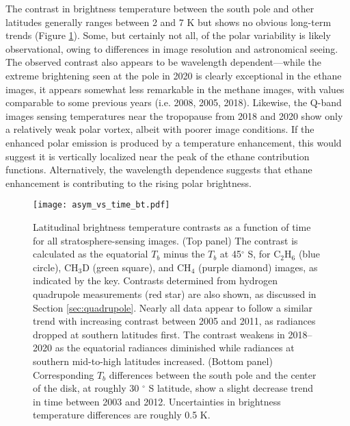 \documentclass[twocolumn,10pt]{aastex631}
\begin{document}
The contrast in brightness temperature between the south pole and other latitudes generally ranges between 2 and 7 K but shows no obvious long-term trends (Figure \ref{fig:asymm}). Some, but certainly not all, of the polar variability is likely observational, owing to differences in image resolution and astronomical seeing. The observed contrast also appears to be wavelength dependent---while the extreme brightening seen at the pole in 2020 is clearly exceptional in the ethane images, it appears somewhat less remarkable in the methane images, with values comparable to some previous years (i.e. 2008, 2005, 2018). Likewise, the Q-band images sensing temperatures near the tropopause from 2018 and 2020 show only a relatively weak polar vortex, albeit with poorer image conditions. If the enhanced polar emission is produced by a temperature enhancement, this would suggest it is vertically localized near the peak of the ethane contribution functions.  Alternatively, the wavelength dependence suggests that ethane enhancement is contributing to the rising polar brightness.   

\begin{figure}
    \centering
    \texttt{[image: asym\_vs\_time\_bt.pdf]}
    \caption{Latitudinal brightness temperature contrasts as a function of time for all stratosphere-sensing images.  (Top panel) The contrast is calculated as the equatorial $T_b$ minus the $T_b$ at 45$^{\circ}$ S, for C$_2$H$_6$ (blue circle), CH$_3$D (green square), and CH$_4$ (purple diamond) images, as indicated by the key.  Contrasts determined from hydrogen quadrupole measurements (red star) are also shown, as discussed in Section \ref{sec:quadrupole}. Nearly all data appear to follow a similar trend with increasing contrast between 2005 and 2011, as radiances dropped at southern latitudes first.  The contrast weakens in 2018--2020 as the equatorial radiances diminished while radiances at southern mid-to-high latitudes increased. (Bottom panel) Corresponding $T_b$ differences between the south pole and the center of the disk, at roughly 30 $^{\circ}$ S latitude, show a slight decrease trend in time between 2003 and 2012. Uncertainties in brightness temperature differences are roughly 0.5 K.}
    \label{fig:asymm}
\end{figure}
\end{document}
